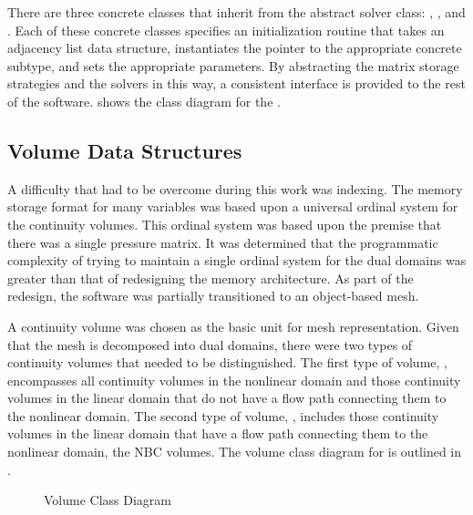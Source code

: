 There are three concrete classes that inherit from the abstract solver class: , , and .
Each of these concrete classes specifies an initialization routine that takes an adjacency list data structure, instantiates the  pointer to the appropriate concrete subtype, and sets the appropriate parameters.
By abstracting the matrix storage strategies and the solvers in this way, a consistent interface is provided to the rest of the software.
 shows the class diagram for the  .

\subsection{Volume Data Structures}
\label{subsect:domDecompVolumeStructs}

A difficulty that had to be overcome during this work was indexing.
The memory storage format for many variables was based upon a universal ordinal system for the continuity volumes.
This ordinal system was based upon the premise that there was a single pressure matrix.
It was determined that the programmatic complexity of trying to maintain a single ordinal system for the dual domains was greater than that of redesigning the memory architecture.
As part of the redesign, the software was partially transitioned to an object-based mesh.

A continuity volume was chosen as the basic unit for mesh representation.
Given that the mesh is decomposed into dual domains, there were two types of continuity volumes that needed to be distinguished.
The first type of volume, , encompasses all continuity volumes in the nonlinear domain and those continuity volumes in the linear domain that do not have a flow path connecting them to the nonlinear domain.
The second type of volume, , includes those continuity volumes in the linear domain that have a flow path connecting them to the nonlinear domain, the NBC volumes.
The volume class diagram for \cobra{} is outlined in .

\begin{figure}[ht!]
\singlespace\centering

\caption{Volume Class Diagram}
\label{fig:volumeClassDiagram}
\end{figure}

